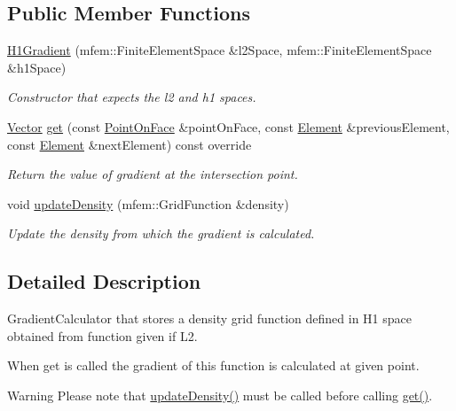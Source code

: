 \subsection*{Public Member Functions}
\begin{DoxyCompactItemize}
\item 
\hyperlink{classraytracer_1_1H1Gradient_a7499a9dcb45b6c813b09fe14d08d98e4}{H1\+Gradient} (mfem\+::\+Finite\+Element\+Space \&l2\+Space, mfem\+::\+Finite\+Element\+Space \&h1\+Space)
\begin{DoxyCompactList}\small\item\em Constructor that expects the l2 and h1 spaces. \end{DoxyCompactList}\item 
\hyperlink{classraytracer_1_1Vector}{Vector} \hyperlink{classraytracer_1_1H1Gradient_a7c847fef0d9cb6fbd143552acace82a5}{get} (const \hyperlink{structraytracer_1_1PointOnFace}{Point\+On\+Face} \&point\+On\+Face, const \hyperlink{classraytracer_1_1Element}{Element} \&previous\+Element, const \hyperlink{classraytracer_1_1Element}{Element} \&next\+Element) const override
\begin{DoxyCompactList}\small\item\em Return the value of gradient at the intersection point. \end{DoxyCompactList}\item 
void \hyperlink{classraytracer_1_1H1Gradient_a3a6918392cf6b2113061626400ef883a}{update\+Density} (mfem\+::\+Grid\+Function \&density)
\begin{DoxyCompactList}\small\item\em Update the density from which the gradient is calculated. \end{DoxyCompactList}\end{DoxyCompactItemize}


\subsection{Detailed Description}
Gradient\+Calculator that stores a density grid function defined in H1 space obtained from function given if L2. 

When get is called the gradient of this function is calculated at given point.

\begin{DoxyWarning}{Warning}
Please note that \hyperlink{classraytracer_1_1H1Gradient_a3a6918392cf6b2113061626400ef883a}{update\+Density()} must be called before calling \hyperlink{classraytracer_1_1H1Gradient_a7c847fef0d9cb6fbd143552acace82a5}{get()}. 
\end{DoxyWarning}


